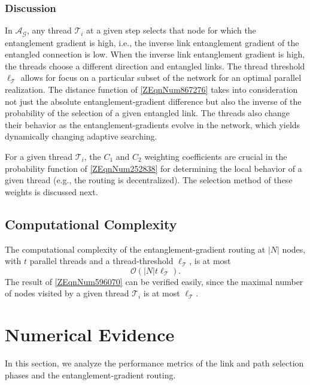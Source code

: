 \documentclass[11pt]{article}%
\begin{document}
\subsubsection{Discussion}
In ${\mathcal{A}}_{\mathcal{G}}$, any thread ${\mathcal{T}}_i$ at a given step selects that node for which the entanglement gradient is high, i.e., the inverse link entanglement gradient of the entangled connection is low. When the inverse link entanglement gradient is high, the threads choose a different direction and entangled links. The thread threshold ${\ell }_{\mathcal{T}}$ allows for focus on a particular subset of the network for an optimal parallel realization. The distance function of \eqref{ZEqnNum867276} takes into consideration not just the absolute entanglement-gradient difference but also the inverse of the probability of the selection of a given entangled link. The threads also change their behavior as the entanglement-gradients evolve in the network, which yields dynamically changing adaptive searching. 

 For a given thread ${\mathcal{T}}_i$, the $C_{\mathrm{1}}$ and $C_{\mathrm{2}}$ weighting coefficients are crucial in the probability function of \eqref{ZEqnNum252838}  for determining the local behavior of a given thread (e.g., the routing is decentralized). The selection method of these weights is discussed next.
 
\subsection{Computational Complexity}
The computational complexity of the entanglement-gradient routing at $\left|N\right|$ nodes, with $t$ parallel threads and  a thread-threshold ${\ell }_{\mathcal{T}}$, is at most
\begin{equation} \label{ZEqnNum596070} 
\mathcal{O}\left(\left|N\right|t{\ell }_{\mathcal{T}}\right).                                                                                  
\end{equation} 
The result of \eqref{ZEqnNum596070} can be verified easily, since the maximal number of nodes visited by a given thread ${\mathcal{T}}_i$ is at most ${\ell }_{\mathcal{T}}$.
 
\section{Numerical Evidence}
\label{sec5}
In this section, we analyze the performance metrics of the link and path selection phases and the entanglement-gradient routing. 
 
\end{document}

